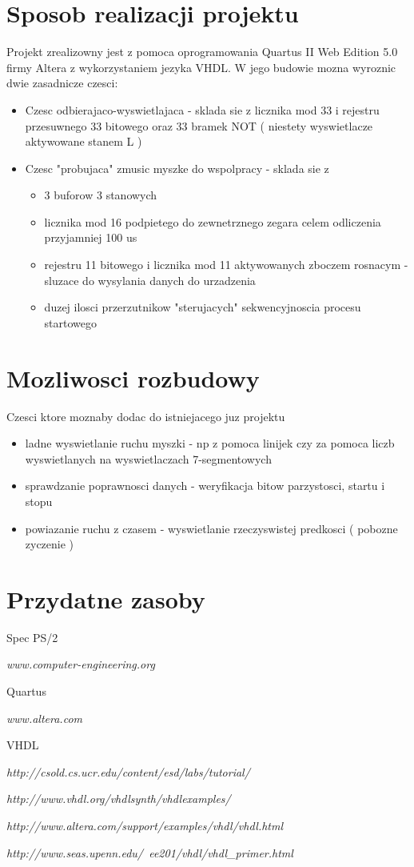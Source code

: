 \documentclass{article}
\begin{document}
	\section{Sposob realizacji projektu}
	Projekt zrealizowny jest z pomoca oprogramowania Quartus II Web Edition 5.0 firmy Altera z wykorzystaniem jezyka VHDL. W jego budowie mozna wyroznic dwie zasadnicze czesci:
	\begin{itemize}
		\item{Czesc odbierajaco-wyswietlajaca} - sklada sie z licznika mod 33 i rejestru przesuwnego 33 bitowego oraz 33 bramek NOT ( niestety wyswietlacze aktywowane stanem L )
		\item{Czesc "probujaca" zmusic myszke do wspolpracy} - sklada sie z 
		\begin{itemize}
			\item{3 buforow 3 stanowych}
			\item{licznika mod 16} podpietego do zewnetrznego zegara celem odliczenia przyjamniej 100 us
			\item{rejestru 11 bitowego i licznika mod 11} aktywowanych zboczem rosnacym - sluzace do wysylania danych do urzadzenia
			\item{duzej ilosci przerzutnikow} "sterujacych" sekwencyjnoscia procesu startowego
		\end{itemize}
	\end{itemize}
	
	\section{Mozliwosci rozbudowy}
	Czesci ktore moznaby dodac do istniejacego juz projektu
	\begin{itemize}
		\item{ladne wyswietlanie ruchu myszki} - np z pomoca linijek czy za pomoca liczb wyswietlanych na wyswietlaczach 7-segmentowych
		\item{sprawdzanie poprawnosci danych} - weryfikacja bitow parzystosci, startu i stopu
		\item{powiazanie ruchu z czasem} - wyswietlanie rzeczyswistej predkosci  ( pobozne zyczenie )
	\end{itemize}
	\section{Przydatne zasoby}
	Spec PS/2

	\it{www.computer-engineering.org}
	
	Quartus

	\it{www.altera.com}
	
	VHDL

	\it{http://csold.cs.ucr.edu/content/esd/labs/tutorial/}

	\it{http://www.vhdl.org/vhdlsynth/vhdlexamples/}

	\it{http://www.altera.com/support/examples/vhdl/vhdl.html}

	\it{http://www.seas.upenn.edu/~ee201/vhdl/vhdl\_primer.html}
\end{document}

